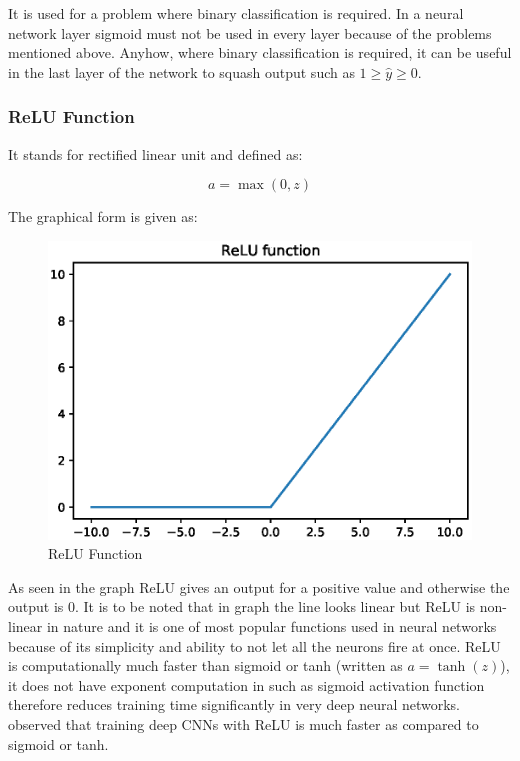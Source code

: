 \documentclass[11pt]{article}
\begin{document}
It is used for a problem where binary classification is required. In a neural network layer sigmoid must not be used in every layer because of the problems mentioned above. Anyhow, where binary classification is required, it can be useful in the last layer of the network to squash output such as $ 1 \geq \hat{y} \geq 0$.

\subsubsection{ReLU Function}
It stands for rectified linear unit and defined as:

\begin{equation}
a = \max (0, z)
\end{equation}

The graphical form is given as:

\begin{figure}[ht!]
	\centering
	\includegraphics[width=.6\linewidth]{files/cnn_architecture/relu.eps}
	\caption{ReLU Function}
	\label{fig: relu}
\end{figure}

As seen in the graph ReLU gives an output for a positive value and otherwise the output is 0. It is to be noted that in graph the line looks linear but ReLU is non-linear in nature and it is one of most popular functions used in neural networks because of its simplicity and ability to not let all the neurons fire at once. ReLU is computationally much faster than sigmoid or tanh (written as $a=\tanh (z)$), it does not have exponent computation in such as sigmoid activation function therefore reduces training time significantly in very deep neural networks. \cite{krizhevsky2012imagenet} observed that training deep CNNs with ReLU is much faster as compared to sigmoid or tanh. 
\end{document}
